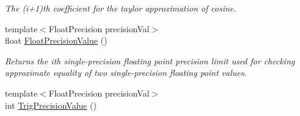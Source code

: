 \begin{DoxyCompactItemize}
\begin{DoxyCompactList}\small\item\em The (i+1)th coefficient for the taylor approximation of cosine. \end{DoxyCompactList}\item 
{\footnotesize template$<$Float\+Precision precision\+Val$>$ }\\float \hyperlink{group___scalar_math_consts_ga7b99abd3f4b8efa174dfb553c47801f7}{Float\+Precision\+Value} ()
\begin{DoxyCompactList}\small\item\em Returns the ith single-\/precision floating point precision limit used for checking approximate equality of two single-\/precision floating point values. \end{DoxyCompactList}\item 
\hypertarget{group___scalar_math_consts_ga762c25f568696ef816d06c6084820049}{}{\footnotesize template$<$Float\+Precision precision\+Val$>$ }\\int \hyperlink{group___scalar_math_consts_ga762c25f568696ef816d06c6084820049}{Trig\+Precision\+Value} ()\label{group___scalar_math_consts_ga762c25f568696ef816d06c6084820049}


\end{DoxyCompactItemize}

